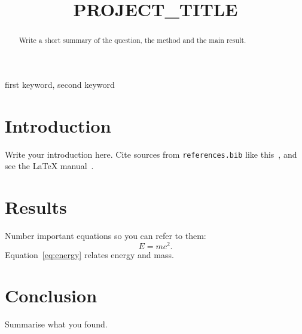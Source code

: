 \documentclass[conference]{IEEEtran}
\begin{document}
\title{{{PROJECT_TITLE}}}
\author{
}

\maketitle

\begin{abstract}
Write a short summary of the question, the method and the main result.
\end{abstract}

\begin{IEEEkeywords}
first keyword, second keyword
\end{IEEEkeywords}

\section{Introduction}
Write your introduction here. Cite sources from \texttt{references.bib} like
this~\cite{einstein1905}, and see the \LaTeX{} manual~\cite{lamport1994}.

\section{Results}
Number important equations so you can refer to them:
\begin{equation}
  E = mc^2 . \label{eq:energy}
\end{equation}
Equation~\eqref{eq:energy} relates energy and mass.

\section{Conclusion}
Summarise what you found.



\end{document}
